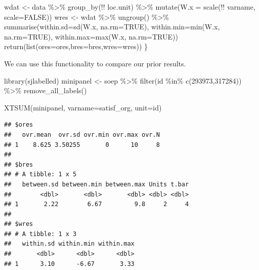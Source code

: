 \documentclass[
]{book}
\newenvironment{Shaded}{\begin{snugshade}}{\end{snugshade}}
\newcommand{\AttributeTok}[1]{\textcolor[rgb]{0.77,0.63,0.00}{#1}}
\newcommand{\ConstantTok}[1]{\textcolor[rgb]{0.00,0.00,0.00}{#1}}
\newcommand{\DecValTok}[1]{\textcolor[rgb]{0.00,0.00,0.81}{#1}}
\newcommand{\FunctionTok}[1]{\textcolor[rgb]{0.00,0.00,0.00}{#1}}
\newcommand{\NormalTok}[1]{#1}
\newcommand{\OtherTok}[1]{\textcolor[rgb]{0.56,0.35,0.01}{#1}}
\newcommand{\SpecialCharTok}[1]{\textcolor[rgb]{0.00,0.00,0.00}{#1}}
\begin{document}
\begin{Shaded}
\begin{Highlighting}[]
\NormalTok{wdat }\OtherTok{\textless{}{-}}\NormalTok{ data }\SpecialCharTok{\%\textgreater{}\%} \FunctionTok{group\_by}\NormalTok{(}\SpecialCharTok{!!}\NormalTok{ loc.unit) }\SpecialCharTok{\%\textgreater{}\%} \FunctionTok{mutate}\NormalTok{(}\AttributeTok{W.x =} \FunctionTok{scale}\NormalTok{(}\SpecialCharTok{!!}\NormalTok{ varname, }\AttributeTok{scale=}\ConstantTok{FALSE}\NormalTok{))}
\NormalTok{wres }\OtherTok{\textless{}{-}}\NormalTok{ wdat }\SpecialCharTok{\%\textgreater{}\%} \FunctionTok{ungroup}\NormalTok{() }\SpecialCharTok{\%\textgreater{}\%} \FunctionTok{summarise}\NormalTok{(}\AttributeTok{within.sd=}\FunctionTok{sd}\NormalTok{(W.x, }\AttributeTok{na.rm=}\ConstantTok{TRUE}\NormalTok{), }\AttributeTok{within.min=}\FunctionTok{min}\NormalTok{(W.x, }\AttributeTok{na.rm=}\ConstantTok{TRUE}\NormalTok{), }\AttributeTok{within.max=}\FunctionTok{max}\NormalTok{(W.x, }\AttributeTok{na.rm=}\ConstantTok{TRUE}\NormalTok{))}
\FunctionTok{return}\NormalTok{(}\FunctionTok{list}\NormalTok{(}\AttributeTok{ores=}\NormalTok{ores,}\AttributeTok{bres=}\NormalTok{bres,}\AttributeTok{wres=}\NormalTok{wres))}
\NormalTok{\}}
\end{Highlighting}
\end{Shaded}

We can use this functionality to compare our prior results.

\begin{Shaded}
\begin{Highlighting}[]
\FunctionTok{library}\NormalTok{(sjlabelled)}
\NormalTok{minipanel }\OtherTok{\textless{}{-}}\NormalTok{ soep }\SpecialCharTok{\%\textgreater{}\%}
  \FunctionTok{filter}\NormalTok{(id }\SpecialCharTok{\%in\%} \FunctionTok{c}\NormalTok{(}\DecValTok{293973}\NormalTok{,}\DecValTok{317284}\NormalTok{)) }\SpecialCharTok{\%\textgreater{}\%}
  \FunctionTok{remove\_all\_labels}\NormalTok{()}

\FunctionTok{XTSUM}\NormalTok{(minipanel, }\AttributeTok{varname=}\NormalTok{satisf\_org, }\AttributeTok{unit=}\NormalTok{id)}
\end{Highlighting}
\end{Shaded}

\begin{verbatim}
## $ores
##   ovr.mean  ovr.sd ovr.min ovr.max ovr.N
## 1    8.625 3.50255       0      10     8
## 
## $bres
## # A tibble: 1 x 5
##   between.sd between.min between.max Units t.bar
##        <dbl>       <dbl>       <dbl> <dbl> <dbl>
## 1       2.22        6.67         9.8     2     4
## 
## $wres
## # A tibble: 1 x 3
##   within.sd within.min within.max
##       <dbl>      <dbl>      <dbl>
## 1      3.10      -6.67       3.33
\end{verbatim}
\end{document}
